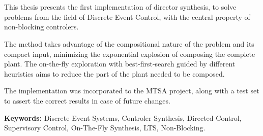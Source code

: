 \chapter*{\runtitle}

\noindent 

This thesis presents the first implementation of director synthesis, to solve problems from the field of Discrete Event Control, with the central property of non-blocking controlers.

The method takes advantage of the compositional nature of the problem and its compact input, minimizing the exponential explosion of composing the complete plant. The on-the-fly exploration with best-first-search guided by different heuristics aims to reduce the part of the plant needed to be composed. 

The implementation was incorporated to the MTSA\cite{mtsaRepo} project, along with a test set to assert the correct results in case of future changes.

\bigskip

\noindent\textbf{Keywords:} Discrete Event Systems, Controler Synthesis, Directed Control, Supervisory Control, On-The-Fly Synthesis, LTS, Non-Blocking.
